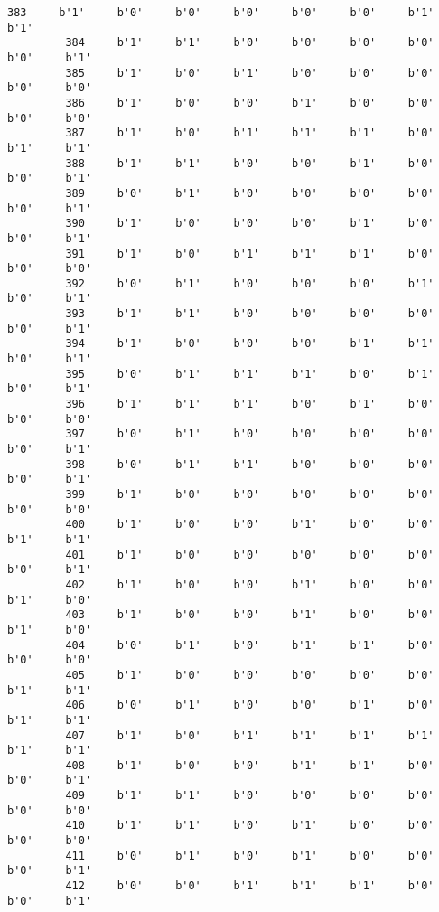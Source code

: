 \documentclass[11pt]{article}
\begin{document}
\begin{Verbatim}[commandchars=\\\{\}]
         383     b'1'     b'0'     b'0'     b'0'     b'0'     b'0'     b'1'     b'1'   
         384     b'1'     b'1'     b'0'     b'0'     b'0'     b'0'     b'0'     b'1'   
         385     b'1'     b'0'     b'1'     b'0'     b'0'     b'0'     b'0'     b'0'   
         386     b'1'     b'0'     b'0'     b'1'     b'0'     b'0'     b'0'     b'0'   
         387     b'1'     b'0'     b'1'     b'1'     b'1'     b'0'     b'1'     b'1'   
         388     b'1'     b'1'     b'0'     b'0'     b'1'     b'0'     b'0'     b'1'   
         389     b'0'     b'1'     b'0'     b'0'     b'0'     b'0'     b'0'     b'1'   
         390     b'1'     b'0'     b'0'     b'0'     b'1'     b'0'     b'0'     b'1'   
         391     b'1'     b'0'     b'1'     b'1'     b'1'     b'0'     b'0'     b'0'   
         392     b'0'     b'1'     b'0'     b'0'     b'0'     b'1'     b'0'     b'1'   
         393     b'1'     b'1'     b'0'     b'0'     b'0'     b'0'     b'0'     b'1'   
         394     b'1'     b'0'     b'0'     b'0'     b'1'     b'1'     b'0'     b'1'   
         395     b'0'     b'1'     b'1'     b'1'     b'0'     b'1'     b'0'     b'1'   
         396     b'1'     b'1'     b'1'     b'0'     b'1'     b'0'     b'0'     b'0'   
         397     b'0'     b'1'     b'0'     b'0'     b'0'     b'0'     b'0'     b'1'   
         398     b'0'     b'1'     b'1'     b'0'     b'0'     b'0'     b'0'     b'1'   
         399     b'1'     b'0'     b'0'     b'0'     b'0'     b'0'     b'0'     b'0'   
         400     b'1'     b'0'     b'0'     b'1'     b'0'     b'0'     b'1'     b'1'   
         401     b'1'     b'0'     b'0'     b'0'     b'0'     b'0'     b'0'     b'1'   
         402     b'1'     b'0'     b'0'     b'1'     b'0'     b'0'     b'1'     b'0'   
         403     b'1'     b'0'     b'0'     b'1'     b'0'     b'0'     b'1'     b'0'   
         404     b'0'     b'1'     b'0'     b'1'     b'1'     b'0'     b'0'     b'0'   
         405     b'1'     b'0'     b'0'     b'0'     b'0'     b'0'     b'1'     b'1'   
         406     b'0'     b'1'     b'0'     b'0'     b'1'     b'0'     b'1'     b'1'   
         407     b'1'     b'0'     b'1'     b'1'     b'1'     b'1'     b'1'     b'1'   
         408     b'1'     b'0'     b'0'     b'1'     b'1'     b'0'     b'0'     b'1'   
         409     b'1'     b'1'     b'0'     b'0'     b'0'     b'0'     b'0'     b'0'   
         410     b'1'     b'1'     b'0'     b'1'     b'0'     b'0'     b'0'     b'0'   
         411     b'0'     b'1'     b'0'     b'1'     b'0'     b'0'     b'0'     b'1'   
         412     b'0'     b'0'     b'1'     b'1'     b'1'     b'0'     b'0'     b'1'   

\end{Verbatim}
\end{document}
